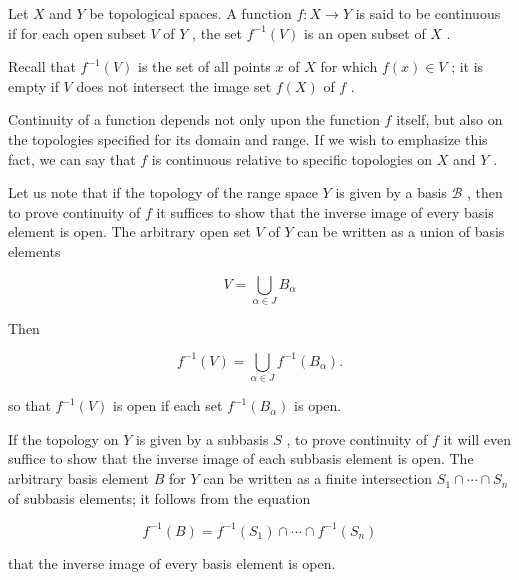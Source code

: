 Let \(X\) and \(Y\) be topological spaces. A function \(f : X \rightarrow  Y\) is said to be continuous if for each open subset \(V\) of \(Y\) , the set \({f}^{-1}\left( V\right)\) is an open subset of \(X\) .

Recall that \({f}^{-1}\left( V\right)\) is the set of all points \(x\) of \(X\) for which \(f\left( x\right)  \in  V\) ; it is empty if \(V\) does not intersect the image set \(f\left( X\right)\) of \(f\) .

Continuity of a function depends not only upon the function \(f\) itself, but also on the topologies specified for its domain and range. If we wish to emphasize this fact, we can say that \(f\) is continuous relative to specific topologies on \(X\) and \(Y\) .

Let us note that if the topology of the range space \(Y\) is given by a basis \(\mathcal{B}\) , then to prove continuity of \(f\) it suffices to show that the inverse image of every basis element is open. The arbitrary open set \(V\) of \(Y\) can be written as a union of basis elements

\[
V = \mathop{\bigcup }\limits_{{\alpha  \in  J}}{B}_{\alpha }
\]

Then

\[
{f}^{-1}\left( V\right)  = \mathop{\bigcup }\limits_{{\alpha  \in  J}}{f}^{-1}\left( {B}_{\alpha }\right) .
\]

so that \({f}^{-1}\left( V\right)\) is open if each set \({f}^{-1}\left( {B}_{\alpha }\right)\) is open.

If the topology on \(Y\) is given by a subbasis \(S\) , to prove continuity of \(f\) it will even suffice to show that the inverse image of each subbasis element is open. The arbitrary basis element \(B\) for \(Y\) can be written as a finite intersection \({S}_{1} \cap  \cdots  \cap  {S}_{n}\) of subbasis elements; it follows from the equation

\[
{f}^{-1}\left( B\right)  = {f}^{-1}\left( {S}_{1}\right)  \cap  \cdots  \cap  {f}^{-1}\left( {S}_{n}\right)
\]

that the inverse image of every basis element is open.

